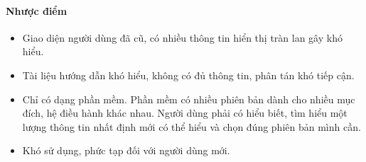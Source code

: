 \paragraph{Nhược điểm}
\begin{itemize}
  \item Giao diện người dùng đã cũ, có nhiều thông tin hiển thị tràn lan gây khó hiểu.
  \item Tài liệu hướng dẫn khó hiểu, không có đủ thông tin, phân tán khó tiếp cận.
  \item Chỉ có dạng phần mềm. Phần mềm có nhiều phiên bản dành cho nhiều mục đích, hệ điều hành khác nhau. Người dùng phải có hiểu biết, tìm hiểu một lượng thông tin nhất định mới có thể hiểu và chọn đúng phiên bản mình cần.
  \item Khó sử dụng, phức tạp đối với người dùng mới.
\end{itemize}
